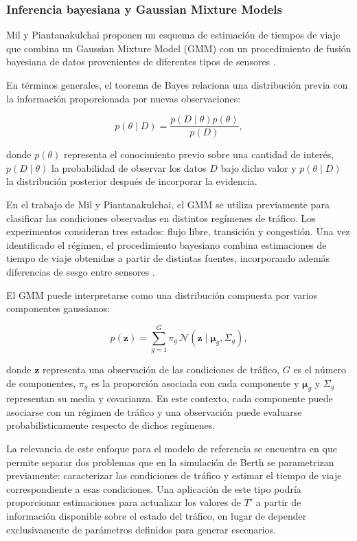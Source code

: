 \documentclass[11pt]{article}
\begin{document}
\subsubsection*{Inferencia bayesiana y Gaussian Mixture Models}

Mil y Piantanakulchai proponen un esquema de estimación de tiempos de viaje que
combina un Gaussian Mixture Model (GMM) con un procedimiento de fusión bayesiana
de datos provenientes de diferentes tipos de sensores
\parencite{mil_piantanakulchai_2018}.

En términos generales, el teorema de Bayes relaciona una distribución previa con la
información proporcionada por nuevas observaciones:

\[
p(\theta\mid D)
=
\frac{p(D\mid\theta)p(\theta)}{p(D)},
\]

donde \(p(\theta)\) representa el conocimiento previo sobre una cantidad de interés,
\(p(D\mid\theta)\) la probabilidad de observar los datos \(D\) bajo dicho valor y
\(p(\theta\mid D)\) la distribución posterior después de incorporar la evidencia.

En el trabajo de Mil y Piantanakulchai, el GMM se utiliza previamente para clasificar
las condiciones observadas en distintos regímenes de tráfico. Los experimentos
consideran tres estados: flujo libre, transición y congestión. Una vez identificado el
régimen, el procedimiento bayesiano combina estimaciones de tiempo de viaje obtenidas
a partir de distintas fuentes, incorporando además diferencias de sesgo entre sensores
\parencite{mil_piantanakulchai_2018}.

El GMM puede interpretarse como una distribución compuesta por varios componentes
gaussianos:

\[
p(\mathbf{z})
=
\sum_{g=1}^{G}
\pi_g\,
\mathcal{N}(\mathbf{z}\mid\boldsymbol{\mu}_g,\Sigma_g),
\]

donde \(\mathbf{z}\) representa una observación de las condiciones de tráfico,
\(G\) es el número de componentes, \(\pi_g\) es la proporción asociada con cada
componente y \(\boldsymbol{\mu}_g\) y \(\Sigma_g\) representan su media y
covarianza. En este contexto, cada componente puede asociarse con un régimen de
tráfico y una observación puede evaluarse probabilísticamente respecto de dichos
regímenes.

La relevancia de este enfoque para el modelo de referencia se encuentra en que permite
separar dos problemas que en la simulación de Berth se parametrizan previamente:
caracterizar las condiciones de tráfico y estimar el tiempo de viaje correspondiente a
esas condiciones. Una aplicación de este tipo podría proporcionar estimaciones para
actualizar los valores de \(T'\) a partir de información disponible sobre el estado del
tráfico, en lugar de depender exclusivamente de parámetros definidos para generar
escenarios.
\end{document}

